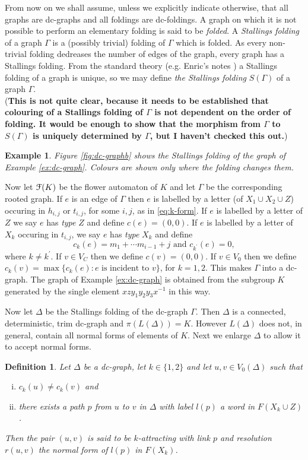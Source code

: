 \documentclass[a4paper,12pt]{article}
\def\D{\Delta }
\def\G{\Gamma }
\def\cF{{\cal{F}}}
\newtheorem{definition}[theorem]{Definition}
\newtheorem{exam}[theorem]{Example}
\newenvironment{example}{\begin{exam} \rm}{\end{exam}}
\numberwithin{equation}{section}
\numberwithin{figure}{section}
\newcommand{\be}{\begin{enumerate}}
\newcommand{\ee}{\end{enumerate}}
\begin{document}
From now on we shall assume, unless we explicitly indicate otherwise,
 that all graphs are dc-graphs and  all foldings are dc-foldings. 
A graph on which  it is not possible to perform an elementary
folding is 
said to be {\em folded}. A {\em Stallings folding} of a graph $\G$ is
 a (possibly trivial) folding of $\G$ which is folded. As every non-trivial 
folding dedreases
 the number of edges of the graph, every graph has a Stallings folding. From the
standard theory (e.g. Enric's notes \cite{ventura11}) a Stallings folding of a graph is unique,
so we may define {\em the Stallings folding} $S(\G)$ of a graph $\G$.\\
({\bf This is not quite clear, because it needs to be established that colouring
of a Stallings folding of $\G$ is not dependent on  the order of folding. It 
would be enough to show that the morphism from $\G$ to $S(\G)$ is uniquely 
determined by $\G$, but I haven't checked this out.})
\begin{example}
Figure \ref{fig:dc-graphb} shows the Stallings folding of the graph of 
Example \ref{ex:dc-graph}. Colours are shown only where the folding changes them.
\end{example}
%
%
Now let $\cF(K)$ be the flower automaton of $K$ and let 
$\G$ be the corresponding rooted graph. If $e$ is an edge of $\G$ then
$e$ is labelled by a letter (of $X_1\cup X_2 \cup Z$) 
occuring in $h_{i,j}$ or $t_{i,j}$, for some $i,j$, as in 
\eqref{eq:k-form}. If $e$ is labelled by a letter of $Z$ we say $e$ has {\em type} $Z$
and define $c(e)=(0,0)$. If $e$ is labelled by a letter of $X_k$ occuring in 
$t_{i,j}$, we say $e$ has {\em type} $X_k$ and define 
\[c_k(e)=m_1+\cdots m_{i-1} +j\textrm{ and } c_{k^\prime}(e)=0,\]
where $k\neq k^\prime$. If $v\in V_C$ then we define $c(v)=(0,0)$. If $v\in V_0$ then
 we define $c_k(v)=\max\{c_k(e): e \textrm{ is incident to } v\}$, for $k=1,2$.  
This makes $\G$ into a dc-graph. The graph of Example \ref{ex:dc-graph} is obtained 
from the subgroup $K$ generated by the single element $xzy_1y_2y_3x^{-1}$ in this way.

Now let $\D$ be the Stallings folding of the dc-graph $\G$.  Then
 $\D$ is a connected, deterministic, trim dc-graph and $\pi(L(\D))=K$. However
$L(\D)$ does not, in general, contain all normal forms of elements of $K$. 
Next we enlarge $\D$ to allow it to accept normal forms. 
\begin{definition}\label{def:attractive}
Let $\D$ be a  dc-graph, let $k\in \{1,2\}$ and let 
$u,v\in V_0(\D)$ such that 
\be[(i)]
\item $c_k(u)\neq c_k(v)$ and 
\item there exists a path $p$ from $u$ to $v$ in $\D$ with label $l(p)$ 
a word in $F(X_k\cup Z)$. 
\ee
Then the pair $(u,v)$ is said to be 
$k${\em -attracting} with {\em link} $p$ and {\em resolution} 
$r(u,v)$ the normal
form of $l(p)$ in $F(X_k)$. 
\end{definition}
\end{document}
